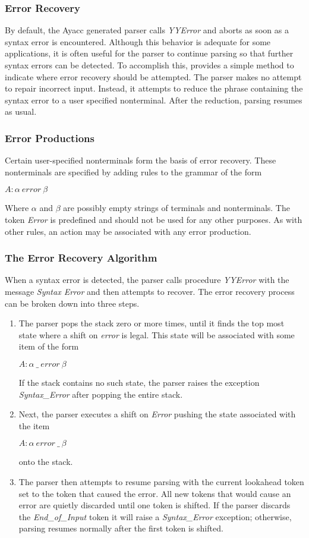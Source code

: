 \subsubsection{Error Recovery}
By default, the Ayacc generated parser calls
{\it YYError}
and aborts
as soon as a syntax error is encountered.  Although this behavior is
adequate for some applications, it is often useful for the parser
to continue parsing so that further syntax errors can be detected.  To
accomplish this, \ayacc provides a simple method
to indicate where error recovery should be attempted.  The parser
makes no attempt to repair incorrect input.  Instead, it attempts
to reduce the phrase containing the syntax error to
a user specified nonterminal.  After the reduction, parsing resumes as usual.
\subsubsection{Error Productions}
Certain user-specified nonterminals form the basis of error
recovery.  These nonterminals are specified by adding rules to the grammar
of the form

     $A : \alpha\ error\ \beta$


Where $\alpha$ and $\beta$ are possibly empty strings of terminals and
nonterminals.  The token
{\it Error}
is predefined and should not be used for any other purposes.  As with
other rules, an action may be associated with any error
production.
\subsubsection{The Error Recovery Algorithm}
When a syntax error is detected, the parser calls procedure
{\it YYError}
with the message
{\it Syntax Error}
and then attempts to recover.  The error recovery process
can be broken down into three steps.
\begin{enumerate}
\item The parser pops the stack zero or more times, until
it finds the top most state where a shift on
{\it error}
is legal.
This state will be associated with some item of the form

       $A : \alpha\ \_\ error\ \beta$

If the stack contains no such state, the parser raises the exception
{\it Syntax\_Error}
after popping the entire stack.

\item Next, the parser executes a shift on
{\it Error}
pushing the state associated with the item

       $A : \alpha\ error\ \_\ \beta$

onto the stack.

\item The parser then attempts to resume parsing with the current lookahead
token set to the token that caused the error.  All new tokens
that would cause an error are quietly discarded
until one token is shifted.  If the parser discards the
{\it End\_of\_Input}
token it will raise a
{\it Syntax\_Error}
exception; otherwise,
parsing resumes normally after the first token is shifted.
\end{enumerate}

